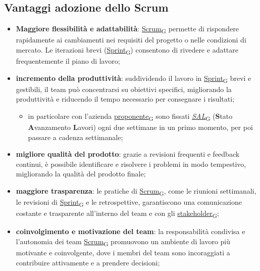 \subsection{Vantaggi adozione dello Scrum}
\begin{itemize}
	\item \textbf{Maggiore flessibilità e adattabilità}: \href{https://7last.github.io/docs/rtb/documentazione-interna/glossario\#scrum}{Scrum\textsubscript{G}} permette di rispondere rapidamente ai cambiamenti nei requisiti del progetto o nelle condizioni di mercato. Le iterazioni brevi (\href{https://7last.github.io/docs/rtb/documentazione-interna/glossario\#sprint}{Sprint\textsubscript{G}}) consentono di rivedere e adattare frequentemente il piano di lavoro;
	\item \textbf{incremento della produttività}: suddividendo il lavoro in \href{https://7last.github.io/docs/rtb/documentazione-interna/glossario\#sprint}{Sprint\textsubscript{G}} brevi e gestibili, il team può concentrarsi su obiettivi specifici, migliorando la produttività e riducendo il tempo necessario per consegnare i risultati;
	      \begin{itemize}
		      \item in particolare con l’azienda \href{https://7last.github.io/docs/rtb/documentazione-interna/glossario\#proponente}{proponente\textsubscript{G}} sono fissati \href{https://7last.github.io/docs/rtb/documentazione-interna/glossario\#stato-avanzamento-lavori}{\textit{SAL}\textsubscript{G}} (\textbf{S}tato \textbf{A}vanzamento \textbf{L}avori) ogni due settimane in un primo momento, per poi passare a cadenza settimanale;
	      \end{itemize}
	\item \textbf{migliore qualità del prodotto}: grazie a revisioni frequenti e feedback continui, è possibile identificare e risolvere i problemi in modo tempestivo, migliorando la qualità del prodotto finale;
	\item \textbf{maggiore trasparenza}: le pratiche di \href{https://7last.github.io/docs/rtb/documentazione-interna/glossario\#scrum}{Scrum\textsubscript{G}}, come le riunioni settimanali, le revisioni di \href{https://7last.github.io/docs/rtb/documentazione-interna/glossario\#sprint}{Sprint\textsubscript{G}} e le retrospettive, garantiscono una comunicazione costante e trasparente all'interno del team e con gli \href{https://7last.github.io/docs/rtb/documentazione-interna/glossario\#stakeholder}{stakeholder\textsubscript{G}};
	\item \textbf{coinvolgimento e motivazione del team}: la responsabilità condivisa e l’autonomia dei team \href{https://7last.github.io/docs/rtb/documentazione-interna/glossario\#scrum}{Scrum\textsubscript{G}} promuovono un ambiente di lavoro più motivante e coinvolgente, dove i membri del team sono incoraggiati a contribuire attivamente e a prendere decisioni;

\end{itemize}
